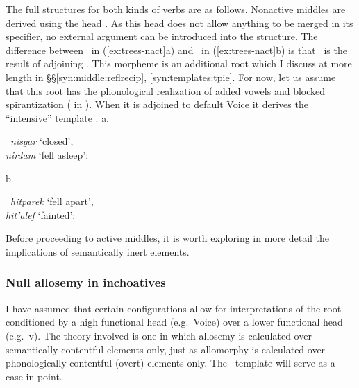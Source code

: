 The full structures for both kinds of verbs are as follows. Nonactive middles are derived using the head \vz. As this head does not allow anything to be merged in its specifier, no external argument can be introduced into the structure. The difference between \tnif~in (\ref{ex:trees-nact}a) and \thit~in (\ref{ex:trees-nact}b) is that \thit~is the result of {adjoining} . This morpheme is an additional root which I discuss at more length in \S\S\ref{syn:middle:reflrecip}, \ref{syn:templates:tpie}. For now, let us assume that this root has the phonological {realization} of {added} vowels and {blocked} spirantization ( in \thit). When it is adjoined to default Voice it derives the ``intensive'' template \tpie.
\ex \label{ex:trees-nact}
a. \begin{minipage}[t]{0.35\textwidth}
	{\textbf{\tnif}~\emph{nisgar} `closed',\\\emph{nirdam} `fell asleep':}\\
	\scalebox{1}{
 	}
\end{minipage}
\begin{minipage}[t]{0.05\textwidth}
	\phantom{asdf}
\end{minipage}
b. \begin{minipage}[t]{0.45\textwidth}
	{\textbf{\thit}~\emph{hitparek} `fell apart',\\\emph{hit'alef} `fainted':}\\
 	\scalebox{1}{
 	}
\end{minipage}
\xe

Before proceeding to active middles, it is worth exploring in more detail the implications of semantically inert elements.

  \subsubsection{Null allosemy in inchoatives} \label{syn:middle:nonactive:null}
I have assumed that certain configurations allow for interpretations of the root conditioned by a high functional head (e.g.~Voice) over a lower functional head (e.g.~v). The theory involved is one in which allosemy is calculated over semantically contentful elements only, just as allomorphy is calculated over phonologically contentful (overt) elements only. The \tnif~template will serve as a case in point.

